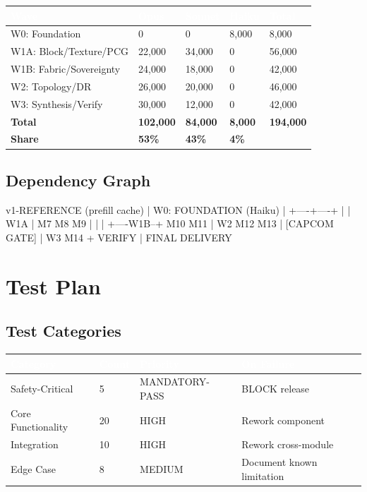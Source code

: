 \documentclass[11pt,letterpaper]{article}
\newcommand{\tableheader}[1]{\textbf{\sffamily\textcolor{white}{#1}}}
\begin{document}
\begin{center}
\begin{tabularx}{\textwidth}{L{3cm}C{2cm}C{2cm}C{2cm}X}
\toprule
{}
\tableheader{Wave} & \tableheader{Opus} & \tableheader{Sonnet} & \tableheader{Haiku} & \tableheader{Total} \\
\midrule
W0: Foundation & 0 & 0 & 8,000 & 8,000 \\
W1A: Block/Texture/PCG & 22,000 & 34,000 & 0 & 56,000 \\
W1B: Fabric/Sovereignty & 24,000 & 18,000 & 0 & 42,000 \\
W2: Topology/DR & 26,000 & 20,000 & 0 & 46,000 \\
W3: Synthesis/Verify & 30,000 & 12,000 & 0 & 42,000 \\
\midrule
{}
\textbf{Total} & \textbf{102,000} & \textbf{84,000} & \textbf{8,000} & \textbf{194,000} \\
\textbf{Share} & \textbf{53\%} & \textbf{43\%} & \textbf{4\%} & \\
\bottomrule
\end{tabularx}
\end{center}

\subsection{Dependency Graph}

\begin{asciibox}
v1-REFERENCE (prefill cache)
        |
       W0: FOUNDATION (Haiku)
        |
   +----+----+
   |         |
  W1A        |
 M7 M8 M9   |
   |         |
   +----W1B--+
      M10 M11
        |
       W2
      M12 M13
        |
    [CAPCOM GATE]
        |
       W3
    M14 + VERIFY
        |
   FINAL DELIVERY
\end{asciibox}

\section{Test Plan}

\subsection{Test Categories}

\begin{center}
\begin{tabularx}{\textwidth}{L{3.5cm}C{1.5cm}L{2.5cm}X}
\toprule
{}
\tableheader{Category} & \tableheader{Count} & \tableheader{Priority} & \tableheader{On Failure} \\
\midrule
Safety-Critical & 5 & MANDATORY-PASS & BLOCK release \\
Core Functionality & 20 & HIGH & Rework component \\
Integration & 10 & HIGH & Rework cross-module \\
Edge Case & 8 & MEDIUM & Document known limitation \\
\bottomrule
\end{tabularx}
\end{center}
\end{document}
